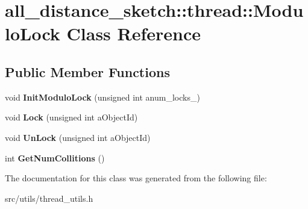 \hypertarget{classall__distance__sketch_1_1thread_1_1ModuloLock}{}\section{all\+\_\+distance\+\_\+sketch\+:\+:thread\+:\+:Modulo\+Lock Class Reference}
\label{classall__distance__sketch_1_1thread_1_1ModuloLock}
\subsection*{Public Member Functions}
\begin{DoxyCompactItemize}
\item 
\hypertarget{classall__distance__sketch_1_1thread_1_1ModuloLock_a46c53763d27b650d13c28995f04260e4}{}void {\bfseries Init\+Modulo\+Lock} (unsigned int anum\+\_\+locks\+\_)\label{classall__distance__sketch_1_1thread_1_1ModuloLock_a46c53763d27b650d13c28995f04260e4}

\item 
\hypertarget{classall__distance__sketch_1_1thread_1_1ModuloLock_a77ac3cee7b6c44c0abd36b68387e933e}{}void {\bfseries Lock} (unsigned int a\+Object\+Id)\label{classall__distance__sketch_1_1thread_1_1ModuloLock_a77ac3cee7b6c44c0abd36b68387e933e}

\item 
\hypertarget{classall__distance__sketch_1_1thread_1_1ModuloLock_a48be622b3419e7dcc6af546a5af61beb}{}void {\bfseries Un\+Lock} (unsigned int a\+Object\+Id)\label{classall__distance__sketch_1_1thread_1_1ModuloLock_a48be622b3419e7dcc6af546a5af61beb}

\item 
\hypertarget{classall__distance__sketch_1_1thread_1_1ModuloLock_af04988f8ee5f2142e8bbe1d531e1398e}{}int {\bfseries Get\+Num\+Collitions} ()\label{classall__distance__sketch_1_1thread_1_1ModuloLock_af04988f8ee5f2142e8bbe1d531e1398e}

\end{DoxyCompactItemize}


The documentation for this class was generated from the following file\+:\begin{DoxyCompactItemize}
\item 
src/utils/thread\+\_\+utils.\+h\end{DoxyCompactItemize}
